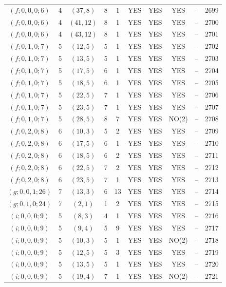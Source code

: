 \begin{longtable}{|c|c|c|c|c|c|c|c|c|c|}
$(f; 0, 0, 0; 6)$ & 4 & $(37, 8)$ & 8 & 1 & YES & YES & YES & -- & 2699\\
$(f; 0, 0, 0; 6)$ & 4 & $(41, 12)$ & 8 & 1 & YES & YES & YES & -- & 2700\\
$(f; 0, 0, 0; 6)$ & 4 & $(43, 12)$ & 8 & 1 & YES & YES & YES & -- & 2701\\
$(f; 0, 1, 0; 7)$ & 5 & $(12, 5)$ & 5 & 1 & YES & YES & YES & -- & 2702\\
$(f; 0, 1, 0; 7)$ & 5 & $(13, 5)$ & 5 & 1 & YES & YES & YES & -- & 2703\\
$(f; 0, 1, 0; 7)$ & 5 & $(17, 5)$ & 6 & 1 & YES & YES & YES & -- & 2704\\
$(f; 0, 1, 0; 7)$ & 5 & $(18, 5)$ & 6 & 1 & YES & YES & YES & -- & 2705\\
$(f; 0, 1, 0; 7)$ & 5 & $(22, 5)$ & 7 & 1 & YES & YES & YES & -- & 2706\\
$(f; 0, 1, 0; 7)$ & 5 & $(23, 5)$ & 7 & 1 & YES & YES & YES & -- & 2707\\
$(f; 0, 1, 0; 7)$ & 5 & $(28, 5)$ & 8 & 7 & YES & YES & NO(2) & -- & 2708\\
$(f; 0, 2, 0; 8)$ & 6 & $(10, 3)$ & 5 & 2 & YES & YES & YES & -- & 2709\\
$(f; 0, 2, 0; 8)$ & 6 & $(17, 5)$ & 6 & 1 & YES & YES & YES & -- & 2710\\
$(f; 0, 2, 0; 8)$ & 6 & $(18, 5)$ & 6 & 2 & YES & YES & YES & -- & 2711\\
$(f; 0, 2, 0; 8)$ & 6 & $(22, 5)$ & 7 & 2 & YES & YES & YES & -- & 2712\\
$(f; 0, 2, 0; 8)$ & 6 & $(23, 5)$ & 7 & 1 & YES & YES & YES & -- & 2713\\
$(g; 0, 0, 1; 26)$ & 7 & $(13, 3)$ & 6 & 13 & YES & YES & YES & -- & 2714\\
$(g; 0, 1, 0; 24)$ & 7 & $(2, 1)$ & 1 & 2 & YES & YES & YES & -- & 2715\\
$(i; 0, 0, 0; 9)$ & 5 & $(8, 3)$ & 4 & 1 & YES & YES & YES & -- & 2716\\
$(i; 0, 0, 0; 9)$ & 5 & $(9, 4)$ & 5 & 9 & YES & YES & YES & -- & 2717\\
$(i; 0, 0, 0; 9)$ & 5 & $(10, 3)$ & 5 & 1 & YES & YES & NO(2) & -- & 2718\\
$(i; 0, 0, 0; 9)$ & 5 & $(12, 5)$ & 5 & 3 & YES & YES & YES & -- & 2719\\
$(i; 0, 0, 0; 9)$ & 5 & $(13, 5)$ & 5 & 1 & YES & YES & YES & -- & 2720\\
$(i; 0, 0, 0; 9)$ & 5 & $(19, 4)$ & 7 & 1 & YES & YES & NO(2) & -- & 2721\\

\end{longtable}
